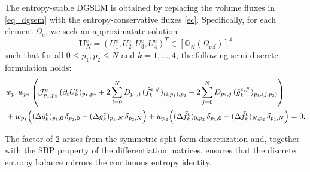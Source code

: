 \documentclass[fleqn,11pt]{amsart}
\newcommand{\omgr}{\Omega_{\mathrm{ref}}}
\newcommand{\QN}{\mathbb Q_N(\omgr)}
\begin{document}
The entropy-stable DGSEM is obtained by replacing the volume fluxes in \eqref{eq_dgsem} with the
entropy-conservative fluxes \eqref{ec}. Specifically, for each element $\Omega_e$, we seek an approximatate solution
$$\bm U_N^e= (U_1^e,U_2^e, U_3^e, U_4^e)^T\in[\QN]^4$$ 
such that for all $0\le p_1,p_2\le N$ and $k=1,\dots,4$, the following semi-discrete formulation holds:
\begin{equation}
\label{eq_esdgsem}
\begin{aligned}
&w_{p_1}w_{p_2}\left(\mathcal{J}_{p_1,p_2}^e\,(\partial_tU_k^e)_{p_1,p_2}
+
2\sum_{i=0}^N D_{p_1,i}\,(\tilde{f}_k^{e,\#})_{(i,p_1),p_2}
+
2
\sum_{j=0}^N D_{p_2,j}\,(\tilde{g}_k^{e,\#})_{p_1,(j,p_2)}\right)\\
&+
w_{p_1}\Bigl(
(\Delta\tilde g_k^e)_{p_1,0}\,\delta_{p_2,0}
-
(\Delta\tilde g_k^e)_{p_1,N}\,\delta_{p_2,N}
\Bigr)
+
w_{p_2}\Bigl(
(\Delta\tilde f_k^e)_{0,p_2}\,\delta_{p_1,0}
-
(\Delta\tilde f_k^e)_{N,p_2}\,\delta_{p_1,N}
\Bigr)
=0.
\end{aligned}
\end{equation}

The factor of $2$ arises from the symmetric split-form discretization and, together with the SBP property of
the differentiation matrices, ensures that the discrete entropy balance mirrors the continuous entropy
identity.
\end{document}
